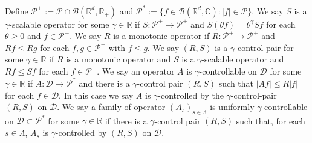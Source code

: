 \documentclass[12pt]{amsart}
\theoremstyle{plain}
\newtheorem{lem}[thm]{Lemma}
\theoremstyle{definition}
\numberwithin{equation}{section}
\newcommand{\added}[1]{{\color{blue}#1}}\newcommand{\deleted}[1]{{\color{red}#1}}
\begin{document}
    Define $\mathcal P^+:= \mathcal P \cap \mathcal B(\mathbb R^d, \mathbb R_+)$ and $\mathcal P^*:= \{f\in \mathcal B(\mathbb R^d, \mathbb C): |f|\in \mathcal P\}$.
    We say $S$ is a $\gamma$-scalable operator for some $\gamma\in \mathbb R$ if $S: \mathcal P^+ \to \mathcal P^+$ and $S(\theta f) = \theta^\gamma Sf$ for each $\theta \geq 0$ and $f \in \mathcal P^+$.
    We say $R$ is a monotonic operator if $R:\mathcal P^+ \to \mathcal P^+$ and $Rf \leq Rg$ for each $f, g \in \mathcal P^+$ with $f\leq g$.
    We say $(R,S)$ is a $\gamma$-control-pair for some $\gamma \in \mathbb R$ if $R$ is a monotonic operator and $S$ is a $\gamma$-scalable operator and $Rf\leq Sf$ for each $f\in \mathcal P^+$.
    We say an operator $A$ is $\gamma$-controllable on $\mathcal D $ for some $\gamma \in \mathbb R$ if $A: \mathcal D \to \mathcal P^*$ and there  is a $\gamma$-control pair $(R,S)$ such that $|Af|\leq R|f|$ for each $f\in \mathcal D$.
    In this case we say $A$ is $\gamma$-controlled by the $\gamma$-control-pair $(R,S)$ on $\mathcal D$.
    We say a family of operator $(A_s)_{s\in \Lambda}$ is uniformly $\gamma$-controllable on $\mathcal D\subset \mathcal P^*$ for some $\gamma \in \mathbb R$ if there is a $\gamma$-control pair $(R,S)$ such that, for each $s\in \Lambda$, $A_s$ is $\gamma$-controlled by $(R, S)$ on $\mathcal D$.
    \begin{comment}

\deleted{
    The first reason for considering $\gamma$-controllable operators is the following:
\begin{lem}
    Suppose that operators $(A_\lambda)_{\lambda\in \Lambda}$ are uniformly $\gamma$-controllable on $\mathcal D$ for some $\gamma \in \mathbb R$ and $\mathcal D \subset \mathcal P^*$.
    Then \added{for each $\kappa\geq0$,} there exists a $\gamma$-scalable operator $S$ such that
\[
    |A_\lambda T_t^\alpha f|
    \leq e^{\gamma t (\alpha  - \added{\kappa} b)} S\added{Q_{\kappa}}f,
    \quad \lambda \in \Lambda, t\geq 0, f\in \added{ \mathcal{D}\cap\mathcal{P}_{\kappa}}.
\]
\end{lem}

\begin{proof}
    Let $(R,S)$ be the $\gamma$-control-pair for $(A_\lambda)_{\lambda\in \Lambda}$.
    Then
\[
    |A_\lambda T_t^\alpha f| \leq R|T_t^\alpha f|
    \leq R (e^{\alpha t  - \kappa bt}Q_{\kappa}f)
    \leq S (e^{\alpha t  - \kappa bt}Q_{\kappa}f)
    \leq e^{\gamma t (\alpha  - \kappa b)} SQ_{\kappa}f.
    \qedhere
\]
\end{proof}
}
\end{comment}
\end{document}
